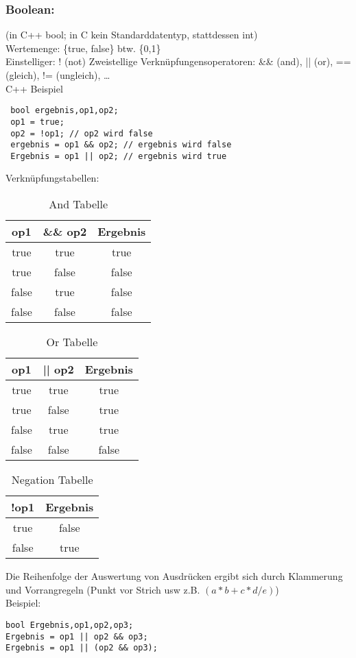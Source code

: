  \subsubsection{Boolean:} (in C++ bool; in C kein Standarddatentyp, stattdessen int) \\
 Wertemenge: \{true, false\} btw. \{0,1\} \\
 Einstelliger: ! (not)
 Zweistellige Verknüpfungensoperatoren: \&\& (and), || (or), == (gleich), != (ungleich), \dots \\
 C++ Beispiel
 \begin{lstlisting}
 bool ergebnis,op1,op2;
 op1 = true;
 op2 = !op1; // op2 wird false
 ergebnis = op1 && op2; // ergebnis wird false
 Ergebnis = op1 || op2; // ergebnis wird true
 \end{lstlisting}
 Verknüpfungstabellen: \\
\begin{table}[p]
	\caption[And Tabelle]{And Tabelle}
	\begin{center}
	\begin{tabular}{cc|c}
		op1 & \&\& op2 & Ergebnis	\\
		\hline
		true & true & true\\
		true & false & false	\\
		false & true & false \\
		false & false & false \\
	\end{tabular}
	\end{center}
\end{table}
\begin{table}[p]
	\caption[Or Tabelle]{Or Tabelle}
	\begin{center}
	\begin{tabular}{cc|c}
		op1 & || op2 & Ergebnis	\\
		\hline
		true & true & true\\
		true & false & true	\\
		false & true & true \\
		false & false & false \\
	\end{tabular}
	\end{center}
\end{table}
\begin{table}[p]
	\caption[Negation Tabelle]{Negation Tabelle}
	\begin{center}
	\begin{tabular}{c|c}
		!op1 &  Ergebnis	\\
		\hline
		true & false\\
		false & true	\\
	\end{tabular}
	\end{center}
\end{table}
\newpage
Die Reihenfolge der Auswertung von Ausdrücken ergibt sich durch Klammerung und Vorrangregeln (Punkt vor Strich usw z.B. $(a*b +c*d/e)$) \\
Beispiel: \\
\begin{lstlisting}
bool Ergebnis,op1,op2,op3;
Ergebnis = op1 || op2 && op3;
Ergebnis = op1 || (op2 && op3);
\end{lstlisting}
 
